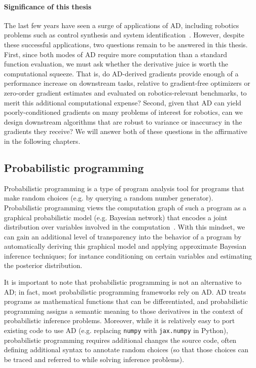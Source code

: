 \paragraph{Significance of this thesis} The last few years have seen a surge of applications of AD, including robotics problems such as control synthesis and system identification~\cite{xuAcceleratedPolicyLearning2022,agrawalDifferentiableConvexOptimization2019,amosOptNetDifferentiableOptimization2017,belubute_peres_lcp_physics,du2021underwater}. However, despite these successful applications, two questions remain to be answered in this thesis. First, since both modes of AD require more computation than a standard function evaluation, we must ask whether the derivative juice is worth the computational squeeze. That is, do AD-derived gradients provide enough of a performance increase on downstream tasks, relative to gradient-free optimizers or zero-order gradient estimates and evaluated on robotics-relevant benchmarks, to merit this additional computational expense? Second, given that AD can yield poorly-conditioned gradients on many problems of interest for robotics, can we design downstream algorithms that are robust to variance or inaccuracy in the gradients they receive? We will answer both of these questions in the affirmative in the following chapters.

\subsection{Probabilistic programming}

Probabilistic programming is a type of program analysis tool for programs that make random choices (e.g. by querying a random number generator). Probabilistic programming views the computation graph of such a program as a graphical probabilistic model (e.g. Bayesian network) that encodes a joint distribution over variables involved in the computation~\cite{woodNewApproachProbabilistic2014}. With this mindset, we can gain an additional level of transparency into the behavior of a program by automatically deriving this graphical model and applying approximate Bayesian inference techniques; for instance conditioning on certain variables and estimating the posterior distribution.

It is important to note that probabilistic programming is not an alternative to AD; in fact, most probabilistic programming frameworks rely on AD. AD treats programs as mathematical functions that can be differentiated, and probabilistic programming assigns a semantic meaning to those derivatives in the context of probabilistic inference problems. Moreover, while it is relatively easy to port existing code to use AD (e.g. replacing \texttt{numpy} with \texttt{jax.numpy} in Python), probabilistic programming requires additional changes the source code, often defining additional syntax to annotate random choices (so that those choices can be traced and referred to while solving inference problems).

